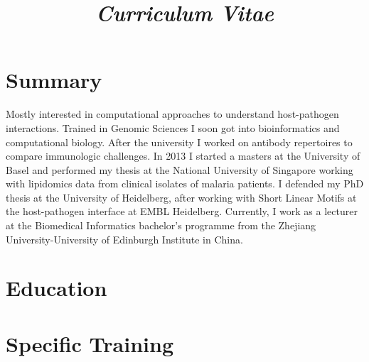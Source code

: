 \documentclass[11pt,a4paper,sans]{moderncv} %
\title{\emph{Curriculum Vitae}}
\begin{document}
\makecvtitle %
\vspace{-1.2cm}
\section{Summary}
Mostly interested in computational approaches to understand host-pathogen interactions. Trained in Genomic Sciences I soon got into bioinformatics and computational biology. After the university I worked on antibody repertoires to compare immunologic challenges. In 2013 I started a masters at the University of Basel and performed my thesis at the National University of Singapore working with lipidomics data from clinical isolates of malaria patients. I defended my PhD thesis at the University of Heidelberg, after working with Short Linear Motifs at the host-pathogen interface at EMBL Heidelberg. Currently, I work as a lecturer at the Biomedical Informatics bachelor's programme from the Zhejiang University-University of Edinburgh Institute in China.

\vspace{0.5cm}

\section{Education}


\vspace{0.5cm}

\section{Specific Training}
\end{document}
